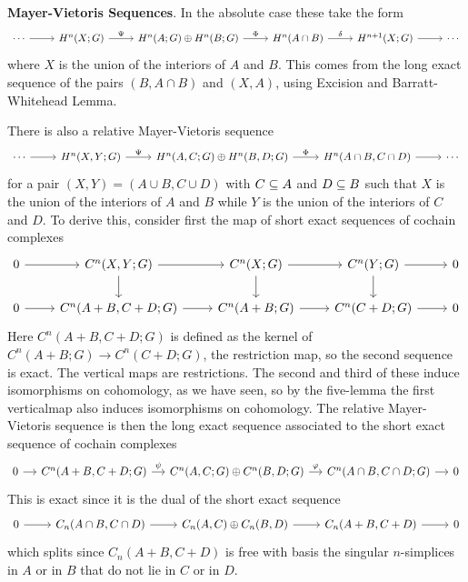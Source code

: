 \textbf{Mayer-Vietoris Sequences}. In the absolute case these take the form
\[\begin{tikzcd}
\cdots\ar[r]&H^n(X;G)\ar[r,"\Psi"]&H^n(A;G)\oplus H^n(B;G)\ar[r,"\Phi"]&H^n(A\cap B)\ar[r,"\delta"]&H^{n+1}(X;G)\ar[r]&\cdots
\end{tikzcd}\]
where $X$ is the union of the interiors of $A$ and $B$. This comes from the long exact sequence of the pairs $(B,A\cap B)$ and $(X,A)$, using Excision and Barratt-Whitehead Lemma.\par
There is also a relative Mayer-Vietoris sequence
\[\begin{tikzcd}
\cdots\ar[r]&H^n(X,Y;G)\ar[r,"\Psi"]&H^n(A,C;G)\oplus H^n(B,D;G)\ar[r,"\Phi"]&H^n(A\cap B,C\cap D)\ar[r]&\cdots
\end{tikzcd}\]
for a pair $(X,Y)=(A\cup B,C\cup D)$ with $C\subseteq A$ and $D\subseteq B$ such that $X$ is the union of the interiors of $A$ and $B$ while $Y$ is the union of the interiors of $C$ and $D$. To derive this, consider first the map of short exact sequences of cochain complexes
\[\begin{tikzcd}
0\ar[r]&C^n(X,Y;G)\ar[d]\ar[r]&C^n(X;G)\ar[r]\ar[d]&C^n(Y;G)\ar[d]\ar[r]&0\\
0\ar[r]&C^n(A+B,C+D;G)\ar[r]&C^n(A+B;G)\ar[r]&C^n(C+D;G)\ar[r]&0
\end{tikzcd}\]
Here $C^n(A+B,C+D;G)$ is defined as the kernel of $C^n(A+B;G)\to C^n(C+D;G)$, the restriction map, so the second sequence is exact. The vertical maps are restrictions. The second and third of these induce isomorphisms on cohomology, as we have seen, so by the five-lemma the first verticalmap also induces isomorphisms on cohomology. The relative Mayer-Vietoris sequence is then the long exact sequence associated to the short exact sequence of cochain complexes
\[\begin{tikzcd}[column sep=small]
0\ar[r]&C^n(A+B,C+D;G)\ar[r,"\psi"]&C^n(A,C;G)\oplus C^n(B,D;G)\ar[r,"\varphi"]&C^n(A\cap B,C\cap D;G)\ar[r]&0
\end{tikzcd}\]
This is exact since it is the dual of the short exact sequence
\[\begin{tikzcd}
0\ar[r]&C_n(A\cap B,C\cap D)\ar[r]&C_n(A,C)\oplus C_n(B,D)\ar[r]&C_n(A+B,C+D)\ar[r]&0
\end{tikzcd}\]
which splits since $C_n(A+B,C+D)$ is free with basis the singular $n$-simplices in $A$ or in $B$ that do not lie in $C$ or in $D$.
